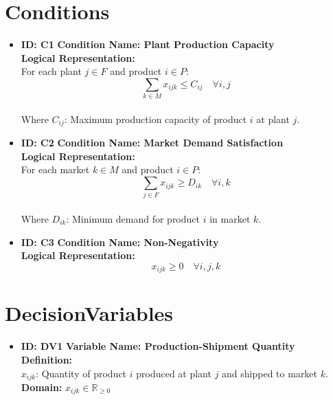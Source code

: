 \documentclass{article}
\begin{document}
\section{Conditions}
\begin{itemize}
    \item \textbf{ID: C1} \textbf{Condition Name: Plant Production Capacity} \\
    \textbf{Logical Representation:} \\
    For each plant $j \in F$ and product $i \in P$: \\
    $$
    \sum_{k \in M} x_{ijk} \leq C_{ij} \quad \forall i,j
    $$ \\
    Where $C_{ij}$: Maximum production capacity of product $i$ at plant $j$.

    \item \textbf{ID: C2} \textbf{Condition Name: Market Demand Satisfaction} \\
    \textbf{Logical Representation:} \\
    For each market $k \in M$ and product $i \in P$: \\
    $$
    \sum_{j \in F} x_{ijk} \geq D_{ik} \quad \forall i,k
    $$ \\
    Where $D_{ik}$: Minimum demand for product $i$ in market $k$.

    \item \textbf{ID: C3} \textbf{Condition Name: Non-Negativity} \\
    \textbf{Logical Representation:} \\
    $$
    x_{ijk} \geq 0 \quad \forall i,j,k
    $$
\end{itemize}

\section{DecisionVariables}
\begin{itemize}
    \item \textbf{ID: DV1} \textbf{Variable Name: Production-Shipment Quantity} \\
    \textbf{Definition:} \\
    $x_{ijk}$: Quantity of product $i$ produced at plant $j$ and shipped to market $k$. \\
    \textbf{Domain:} $x_{ijk} \in \mathbb{R}_{\geq 0}$
\end{itemize}
\end{document}
